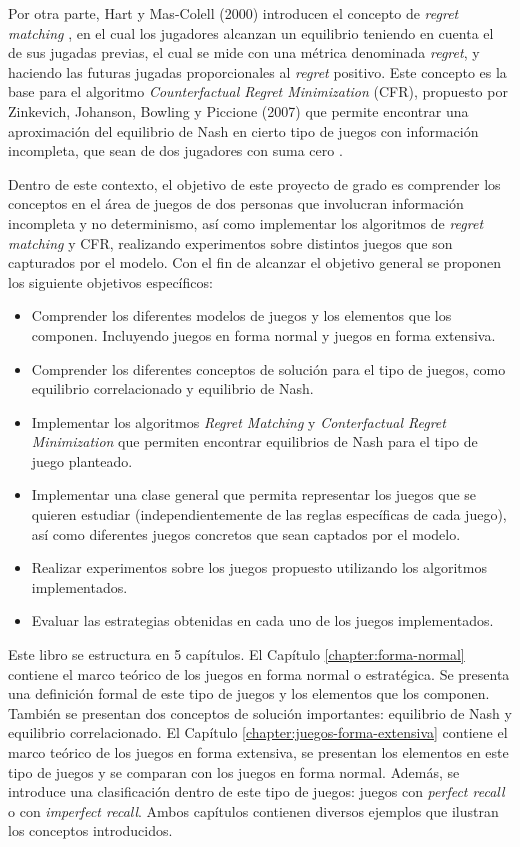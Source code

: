 Por otra parte, Hart y Mas-Colell (2000) introducen el concepto de \textit{regret matching} \cite{bib:correlated-equilibrium}, en el cual los jugadores alcanzan un equilibrio teniendo en cuenta el  de sus jugadas previas, el cual se mide con una métrica denominada \textit{regret}, y haciendo las futuras jugadas proporcionales al \textit{regret} positivo. Este concepto es la base para el algoritmo \textit{Counterfactual Regret Minimization} (CFR), propuesto por Zinkevich, Johanson, Bowling y Piccione (2007) que permite encontrar una aproximación del equilibrio de Nash en cierto tipo de juegos con información incompleta, que sean de dos jugadores con suma cero \cite{bib:cfr}.

Dentro de este contexto, el objetivo de este proyecto de grado es comprender los conceptos en el área de juegos de dos personas que involucran información incompleta y no determinismo, así como implementar los algoritmos de \textit{regret matching} y CFR, realizando experimentos sobre distintos juegos que son capturados por el modelo. Con el fin de alcanzar el objetivo general se proponen los siguiente objetivos específicos:
\begin{itemize}
    \item Comprender los diferentes modelos de juegos y los elementos que los componen. Incluyendo juegos en forma normal y juegos en forma extensiva.
    \item Comprender los diferentes conceptos de solución para el tipo de juegos, como equilibrio correlacionado y equilibrio de Nash.
    \item Implementar los algoritmos \textit{Regret Matching} y \textit{Conterfactual Regret Minimization} que permiten encontrar equilibrios de Nash para el tipo de juego planteado.
    \item Implementar una clase general que permita representar los juegos que se quieren estudiar (independientemente de las reglas específicas de cada juego), así como diferentes juegos concretos que sean captados por el modelo.
    \item Realizar experimentos sobre los juegos propuesto utilizando los algoritmos implementados.
    \item Evaluar las estrategias obtenidas en cada uno de los juegos implementados.
\end{itemize}

Este libro se estructura en 5 capítulos. El Capítulo \ref{chapter:forma-normal} contiene el marco teórico de los juegos en forma normal o estratégica. Se presenta una definición formal de este tipo de juegos y los elementos que los componen. También se presentan dos conceptos de solución importantes: equilibrio de Nash y equilibrio correlacionado. El Capítulo \ref{chapter:juegos-forma-extensiva} contiene el marco teórico de los juegos en forma extensiva, se presentan los elementos en este tipo de juegos y se comparan con los juegos en forma normal. Además, se introduce una clasificación dentro de este tipo de juegos: juegos con \textit{perfect recall} o con \textit{imperfect recall}. Ambos capítulos contienen diversos ejemplos que ilustran los conceptos introducidos.

